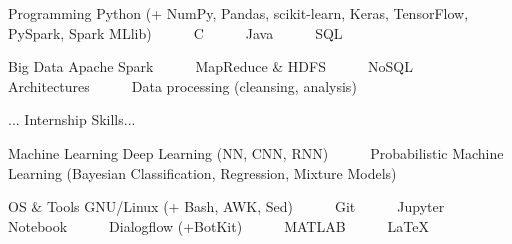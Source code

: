 

\begin{cvskills}

  \cvskill
    {Programming} %
    {Python (+ NumPy, Pandas, scikit-learn, Keras, TensorFlow, PySpark, Spark MLlib)~~~\textbullet~~~C~~~\textbullet~~~Java~~~\textbullet~~~SQL} %

  \cvskill
    {Big Data} %
    {Apache Spark~~~\textbullet~~~MapReduce \& HDFS~~~\textbullet~~~NoSQL Architectures~~~\textbullet~~~Data processing (cleansing, analysis)} %
    
\cvskill
    {...} %
    {Internship Skills...} %

  \cvskill
    {Machine Learning} %
    {Deep Learning (NN, CNN, RNN)~~~\textbullet~~~Probabilistic Machine Learning (Bayesian Classification, Regression, Mixture Models)} %

  \cvskill
    {OS \& Tools} %
    {GNU/Linux (+ Bash, AWK, Sed)~~~\textbullet~~~Git~~~\textbullet~~~Jupyter Notebook~~~\textbullet~~~Dialogflow (+BotKit)~~~\textbullet~~~MATLAB~~~\textbullet~~~LaTeX} %

\end{cvskills}
